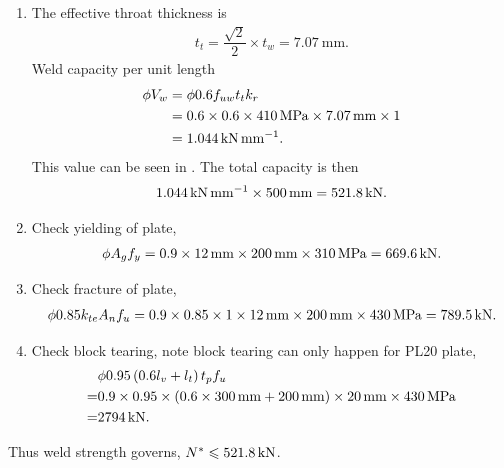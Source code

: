 \begin{solution}
\begin{enumerate}
\item
The effective throat thickness is
\begin{gather*}
t_t=\dfrac{\sqrt{2}}{2}\times{}t_w=\SI{7.07}{\mm}.
\end{gather*}
Weld capacity per unit length
\begin{align*}
\phi{}V_w&=\phi{}0.6f_{uw}t_tk_r\\
&=0.6\times0.6\times\SI{410}{\mega\pascal}\times\SI{7.07}{\milli\meter}\times1\\
&=\SI{1.044}{\kilo\newton\per\milli\meter}.
\end{align*}
This value can be seen in .
The total capacity is then
\begin{gather*}
\SI{1.044}{\kilo\newton\per\milli\meter}\times\SI{500}{\milli\meter}=\SI{521.8}{\kilo\newton}.
\end{gather*}
\item
Check yielding of plate,
\begin{gather*}
\phi{}A_gf_y=0.9\times\SI{12}{\milli\meter}\times\SI{200}{\milli\meter}\times\SI{310}{\mega\pascal}=\SI{669.6}{\kilo\newton}.
\end{gather*}
\item
Check fracture of plate,
\begin{gather*}
\phi0.85k_{te}A_nf_u=0.9\times0.85\times1\times\SI{12}{\milli\meter}\times\SI{200}{\milli\meter}\times\SI{430}{\mega\pascal}=\SI{789.5}{\kilo\newton}.
\end{gather*}
\item
Check block tearing, note block tearing can only happen for PL20 plate,
\begin{align*}
&\phi0.95\left(0.6l_{v}+l_{t}\right)t_pf_u\\=&0.9\times0.95\times\left(0.6\times\SI{300}{\milli\meter}+\SI{200}{\milli\meter}\right)\times\SI{20}{\milli\meter}\times\SI{430}{\mega\pascal}\\
=&\SI{2794}{\kilo\newton}.
\end{align*}
\end{enumerate}
Thus weld strength governs, $N^*\leqslant\SI{521.8}{\kilo\newton}$.
\end{solution}

